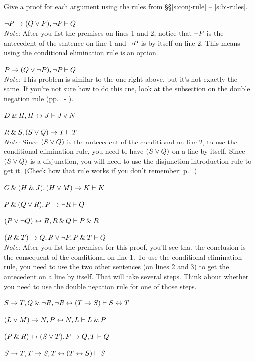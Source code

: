 \problempart\label{practice-proofs-1}
Give a proof for each argument using the rules from \S\S \ref{s:conj-rule} -- \ref{s:bi-rules}.
\begin{earg}
\item ${\neg} P \rightarrow (Q \vee P), {\neg} P \vdash Q$\\
\textit{Note:} After you list the premises on lines 1 and 2, notice that ${\neg} P$ is the antecedent of the sentence on line 1 and ${\neg} P$ is by itself on line 2. This means using the conditional elimination rule is an option.
\medskip
\item $P \rightarrow (Q \vee {\neg} P), {\neg} P \vdash Q$\\
\textit{Note:} This problem is similar to the one right above, but it's not exactly the same. If you're not sure how to do this one, look at the subsection on the double negation rule (pp.~\pageref{subsection-DN} - \pageref{DN-box}).
\medskip
\item $D \mathbin{\&} H, H \leftrightarrow J  \vdash J \vee N$\smallskip 

\item $R \mathbin{\&} S, (S \vee Q) \rightarrow T \vdash T$\\
\textit{Note:} Since $(S \vee Q)$ is the antecedent of the conditional on line 2, to use the conditional elimination rule, you need to have $(S \vee Q)$ on a line by itself. Since $(S \vee Q)$ is a disjunction, you will need to use the disjunction introduction rule to get it. (Check how that rule works if you don't remember: p.~\pageref{di-rule-box}.)
\medskip

\item $G \mathbin{\&} (H \mathbin{\&} J), (H \vee M) \rightarrow K \vdash K$\smallskip
\item $P \mathbin{\&} (Q \vee R), P \rightarrow {\neg} R \vdash Q$\smallskip
\item $(P \vee {\neg} Q) \leftrightarrow R, R \mathbin{\&} Q \vdash P \mathbin{\&} R$\smallskip
\item $(R \mathbin{\&} T) \rightarrow Q, R \vee {\neg} P, P \mathbin{\&} T \vdash Q$\\
\textit{Note:} After you list the premises for this proof, you'll see that the conclusion is the consequent of the conditional on line 1. To use the conditional elimination rule, you need to use the two other sentences (on lines 2 and 3) to get the antecedent on a line by itself. That will take several steps. Think about whether you need to use the double negation rule for one of those steps. 
\medskip

\item $S \rightarrow T, Q \mathbin{\&} {\neg} R, {\neg} R \leftrightarrow (T \rightarrow S) \vdash S \leftrightarrow T $\smallskip
\item $(L \vee M) \rightarrow N, P \leftrightarrow N, L \vdash L \mathbin{\&} P$\smallskip
\item $(P \mathbin{\&} R) \leftrightarrow (S \vee T), P \rightarrow Q, T \vdash Q$\smallskip
\item $S \rightarrow T, T \rightarrow S, T \leftrightarrow (T \leftrightarrow S) \vdash S$\smallskip
\end{earg}


